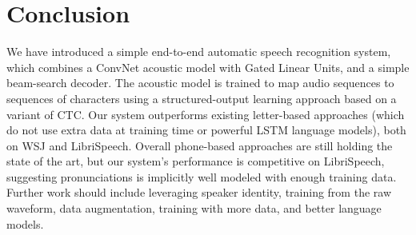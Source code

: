 \documentclass{article}
\begin{document}
\section{Conclusion}

We have introduced a simple end-to-end automatic speech recognition system,
which combines a ConvNet acoustic model with Gated Linear Units, and a
simple beam-search decoder. The acoustic model is trained to map audio
sequences to sequences of characters using a structured-output learning
approach based on a variant of CTC. Our system outperforms existing
letter-based approaches (which do not use extra data at training time
or powerful LSTM language models),
both on WSJ and LibriSpeech. 
Overall phone-based approaches are still
holding the state of the art, but our system's performance is competitive
on LibriSpeech, suggesting pronunciations is implicitly well modeled with
enough training data. Further work should include leveraging speaker
identity, training from the raw waveform, data augmentation, training with
more data, and better language models.



\end{document}
